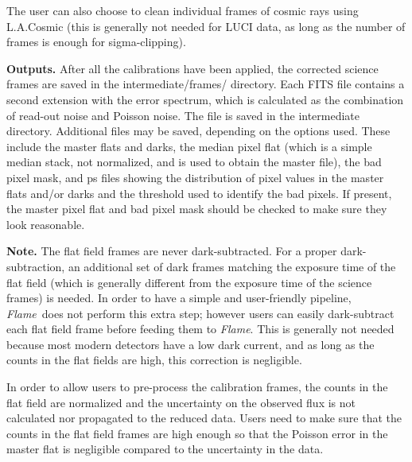 \documentclass[a4paper]{article}
\newcommand{\flame}{\emph{Flame}}
\begin{document}
\begin{sloppypar}
The user can also choose to clean individual frames of cosmic rays using L.A.Cosmic (this is generally not needed for LUCI data, as long as the number of frames is enough for sigma-clipping).

\medskip
\noindent
\textbf{Outputs.} After all the calibrations have been applied, the corrected science frames are saved in the intermediate/frames/ directory. Each FITS file contains a second extension with the error spectrum, which is calculated as the combination of read-out noise and Poisson noise. The  file is saved in the intermediate directory. Additional files may be saved, depending on the options used. These include the master flats and darks, the median pixel flat (which is a simple median stack, not normalized, and is used to obtain the master file), the bad pixel mask, and ps files showing the distribution of pixel values in the master flats and/or darks and the threshold used to identify the bad pixels. If present, the master pixel flat and bad pixel mask should be checked to make sure they look reasonable.


\medskip
\noindent
\textbf{Note.} The flat field frames are never dark-subtracted. For a proper dark-subtraction, an additional set of dark frames matching the exposure time of the flat field (which is generally different from the exposure time of the science frames) is needed. In order to have a simple and user-friendly pipeline, \flame\ does not perform this extra step; however users can easily dark-subtract each flat field frame before feeding them to \flame. This is generally not needed because most modern detectors have a low dark current, and as long as the counts in the flat fields are high, this correction is negligible.

In order to allow users to pre-process the calibration frames, the counts in the flat field are normalized and the uncertainty on the observed flux is not calculated nor propagated to the reduced data. Users need to make sure that the counts in the flat field frames are high enough so that the Poisson error in the master flat is negligible compared to the uncertainty in the data.



\end{sloppypar}
\end{document}
